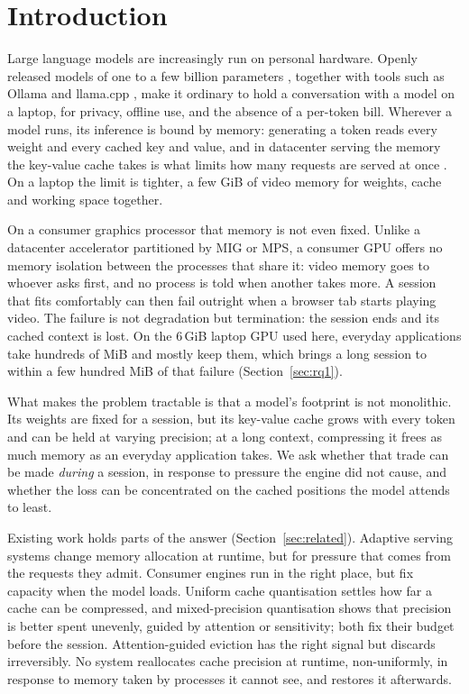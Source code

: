 \documentclass{article}
\begin{document}
\section{Introduction}
\label{sec:introduction}

Large language models are increasingly run on personal hardware. Openly
released models of one to a few billion parameters \cite{qwen2024report},
together with tools such as Ollama \cite{ollama} and llama.cpp \cite{llamacpp},
make it ordinary to hold a conversation with a model on a laptop, for privacy,
offline use, and the absence of a per-token bill. Wherever a model runs, its
inference is bound by memory: generating a token reads every weight and every
cached key and value, and in datacenter serving the memory the key-value cache
takes is what limits how many requests are served at once
\cite{kwon2023pagedattention}. On a laptop the limit is tighter, a few GiB of
video memory for weights, cache and working space together.

On a consumer graphics processor that memory is not even fixed. Unlike a
datacenter accelerator partitioned by MIG or MPS, a consumer GPU offers no
memory isolation between the processes that share it: video memory goes to
whoever asks first, and no process is told when another takes more. A session
that fits comfortably can then fail outright when a browser tab starts playing
video. The failure is not degradation but termination: the session ends and its
cached context is lost. On the 6\,GiB laptop GPU used here, everyday
applications take hundreds of MiB and mostly keep them, which brings a long
session to within a few hundred MiB of that failure (Section~\ref{sec:rq1}).

What makes the problem tractable is that a model's footprint is not
monolithic. Its weights are fixed for a session, but its key-value cache grows
with every token and can be held at varying precision; at a long context,
compressing it frees as much memory as an everyday application takes. We ask
whether that trade can be made \textit{during} a session, in response to
pressure the engine did not cause, and whether the loss can be concentrated on
the cached positions the model attends to least.

Existing work holds parts of the answer (Section~\ref{sec:related}). Adaptive
serving systems change memory allocation at runtime, but for pressure that
comes from the requests they admit. Consumer engines run in the right place,
but fix capacity when the model loads. Uniform cache quantisation settles how
far a cache can be compressed, and mixed-precision quantisation shows that
precision is better spent unevenly, guided by attention or sensitivity; both
fix their budget before the session. Attention-guided eviction has the right
signal but discards irreversibly. No system reallocates cache precision at
runtime, non-uniformly, in response to memory taken by processes it cannot see,
and restores it afterwards.
\end{document}
